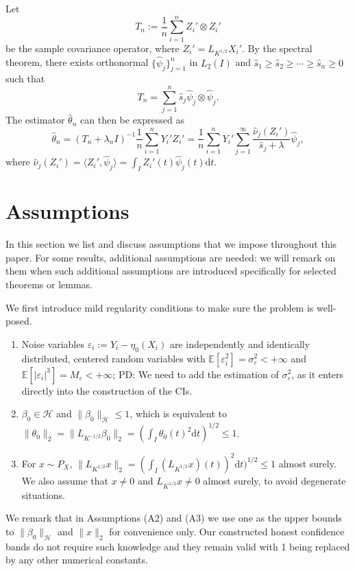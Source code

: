 \documentclass[11pt,a4paper]{article}
\renewcommand{\hat}{\widehat}
\theoremstyle{definition}
\theoremstyle{plain}
\theoremstyle{remark}
\newcommand{\ud}{\mathrm d}
\newcommand{\mH}{\mathcal H}
\newcommand{\pd}[1]{
	{ \color{blue} PD: #1}
}
\begin{document}
Let
$$
T_n := \frac{1}{n}\sum_{i=1}^n Z_i'\otimes Z_i'
$$
be the sample covariance operator, where $Z_i'=L_{K^{1/2}}X_i'$. By the spectral theorem, there exists orthonormal $\{\hat\psi_j\}_{j=1}^n$ in $L_2(I)$ and $\hat s_1\geq \hat s_2\geq\cdots\geq \hat s_n\geq 0$ such that
$$
T_n = \sum_{j=1}^n \hat s_j\hat \psi_j\otimes\hat \psi_j.
$$
The estimator $\hat\theta_n$ can then be expressed as
\begin{equation}
\hat\theta_n = (T_n+\lambda_n I)^{-1}\frac{1}{n}\sum_{i=1}^n Y_i'Z_i' = \frac{1}{n}\sum_{i=1}^n Y_i'\sum_{j=1}^{\infty}\frac{\hat\nu_j(Z_i')}{\hat s_j+\lambda}\hat\psi_j,
\label{eq:krr-nointercept-fpca}
\end{equation}
where $\hat\nu_j(Z_i') = \langle Z_i', \hat\psi_j\rangle=\int_I Z_i'(t)\hat\psi_j(t)\ud t$.

\section{Assumptions}

In this section we list and discuss assumptions that we impose throughout this paper. For some results, additional assumptions are needed: 
we will remark on them when such additional assumptions are introduced specifically for selected theorems or lemmas.

We first introduce mild regularity conditions to make sure the problem is well-posed.
\begin{enumerate}
\item[(A1)] Noise variables $\varepsilon_i:=Y_i-\eta_0(X_i)$ are independently and identically distributed, centered random variables with $\mathbb E[\varepsilon_i^2]=\sigma_\varepsilon^2<+\infty$
and $\mathbb E[|\varepsilon_i|^3]=M_\varepsilon < +\infty$; \pd{We need to add the estimation of $\sigma_\varepsilon^2$, as it enters directly into the construction of the CIs.}
\item[(A2)] $\beta_0\in\mH$ and $\|\beta_0\|_\mH\leq 1$, which is equivalent to $\|\theta_0\|_2=\|L_{K^{-1/2}}\beta_0\|_2 =(\int_I \theta_0(t)^2\ud t)^{1/2} \leq 1$.
\item[(A3)] For $x\sim P_X$, $\|L_{K^{1/2}}x\|_2= (\int_I (L_{K^{1/2}}x)(t))^2\ud t)^{1/2}\leq 1$ almost surely. We also assume that $x\neq 0$ and $L_{K^{1/2}}x\neq 0$ almost surely, to avoid degenerate situations.
\end{enumerate}

We remark that in Assumptions (A2) and (A3) we use one as the upper bounds to $\|\beta_0\|_\mH$ and $\|x\|_2$ for convenience only. Our constructed honest confidence bands do not require such knowledge
and they remain valid with 1 being replaced by any other numerical constants.
\end{document}
